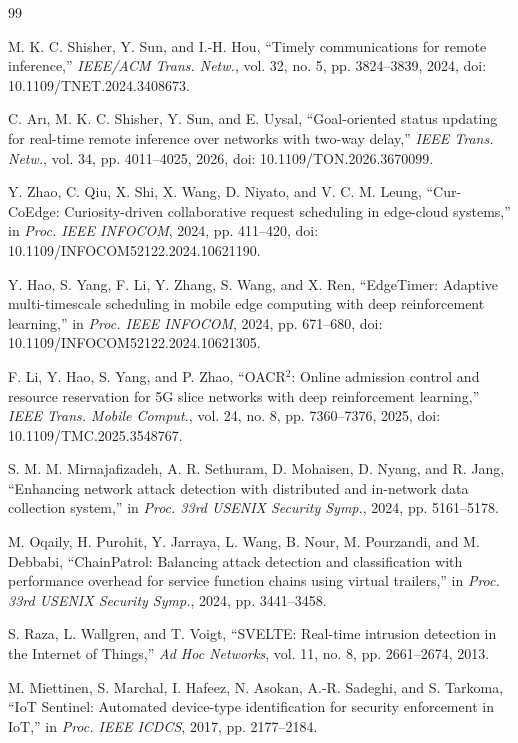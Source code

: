 \documentclass[10pt,journal]{IEEEtran}
\begin{document}
\begin{thebibliography}{99}

M. K. C. Shisher, Y. Sun, and I.-H. Hou,
``Timely communications for remote inference,'' \emph{IEEE/ACM Trans. Netw.},
vol. 32, no. 5, pp. 3824--3839, 2024,
doi: 10.1109/TNET.2024.3408673.

C. Ar\i, M. K. C. Shisher, Y. Sun, and E. Uysal,
``Goal-oriented status updating for real-time remote inference over networks
with two-way delay,'' \emph{IEEE Trans. Netw.}, vol. 34, pp. 4011--4025,
2026, doi: 10.1109/TON.2026.3670099.

Y. Zhao, C. Qiu, X. Shi, X. Wang, D. Niyato, and V. C. M. Leung,
``Cur-CoEdge: Curiosity-driven collaborative request scheduling in edge-cloud
systems,'' in \emph{Proc. IEEE INFOCOM}, 2024, pp. 411--420,
doi: 10.1109/INFOCOM52122.2024.10621190.

Y. Hao, S. Yang, F. Li, Y. Zhang, S. Wang, and X. Ren,
``EdgeTimer: Adaptive multi-timescale scheduling in mobile edge computing with
deep reinforcement learning,'' in \emph{Proc. IEEE INFOCOM}, 2024,
pp. 671--680, doi: 10.1109/INFOCOM52122.2024.10621305.

F. Li, Y. Hao, S. Yang, and P. Zhao,
``OACR$^2$: Online admission control and resource reservation for 5G slice
networks with deep reinforcement learning,'' \emph{IEEE Trans. Mobile
Comput.}, vol. 24, no. 8, pp. 7360--7376, 2025,
doi: 10.1109/TMC.2025.3548767.

S. M. M. Mirnajafizadeh, A. R. Sethuram, D. Mohaisen, D. Nyang, and R. Jang,
``Enhancing network attack detection with distributed and in-network data
collection system,'' in \emph{Proc. 33rd USENIX Security Symp.}, 2024,
pp. 5161--5178.

M. Oqaily, H. Purohit, Y. Jarraya, L. Wang, B. Nour, M. Pourzandi, and
M. Debbabi, ``ChainPatrol: Balancing attack detection and classification with
performance overhead for service function chains using virtual trailers,'' in
\emph{Proc. 33rd USENIX Security Symp.}, 2024, pp. 3441--3458.

S. Raza, L. Wallgren, and T. Voigt,
``SVELTE: Real-time intrusion detection in the Internet of Things,''
\emph{Ad Hoc Networks}, vol. 11, no. 8, pp. 2661--2674, 2013.

M. Miettinen, S. Marchal, I. Hafeez, N. Asokan, A.-R. Sadeghi, and S. Tarkoma,
``IoT Sentinel: Automated device-type identification for security enforcement
in IoT,'' in \emph{Proc. IEEE ICDCS}, 2017, pp. 2177--2184.


\end{thebibliography}
\end{document}
